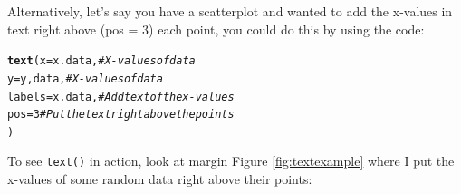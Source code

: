 \documentclass{tufte-book}\usepackage[]{graphicx}\usepackage[]{color}
\makeatletter
\newcommand{\hlnum}[1]{\textcolor[rgb]{0.686,0.059,0.569}{#1}}%
\newcommand{\hlcom}[1]{\textcolor[rgb]{0.678,0.584,0.686}{\textit{#1}}}%
\newcommand{\hlstd}[1]{\textcolor[rgb]{0.345,0.345,0.345}{#1}}%
\newcommand{\hlkwc}[1]{\textcolor[rgb]{0.333,0.667,0.333}{#1}}%
\newcommand{\hlkwd}[1]{\textcolor[rgb]{0.737,0.353,0.396}{\textbf{#1}}}%
\newenvironment{kframe}{%
 \def\at@end@of@kframe{}%
 \ifinner\ifhmode%
  \def\at@end@of@kframe{\end{minipage}}%
  \begin{minipage}{\columnwidth}%
 \fi\fi%
 \def\FrameCommand##1{\hskip\@totalleftmargin \hskip-\fboxsep
 \colorbox{shadecolor}{##1}\hskip-\fboxsep
     \hskip-\linewidth \hskip-\@totalleftmargin \hskip\columnwidth}%
 \MakeFramed {\advance\hsize-\width
   \@totalleftmargin\z@ \linewidth\hsize
   \@setminipage}}%
 {\par\unskip\endMakeFramed%
 \at@end@of@kframe}
\newenvironment{knitrout}{}{} %
\makeatother
\begin{document}
Alternatively, let's say you have a scatterplot and wanted to add the x-values in text right above (pos = 3) each point, you could do this by using the code:

\begin{knitrout}
\color{fgcolor}\begin{kframe}
\begin{alltt}
\hlkwd{text}\hlstd{(}\hlkwc{x} \hlstd{= x.data,} \hlcom{# X-values of data}
     \hlkwc{y} \hlstd{= y,data,} \hlcom{# X-values of data}
     \hlkwc{labels} \hlstd{= x.data,} \hlcom{# Add text of the x-values}
     \hlkwc{pos} \hlstd{=} \hlnum{3} \hlcom{# Put the text right above the points}
     \hlstd{)}
\end{alltt}
\end{kframe}
\end{knitrout}

To see \texttt{text()} in action, look at margin Figure \ref{fig:textexample} where I put the x-values of some random data right above their points:
\end{document}
